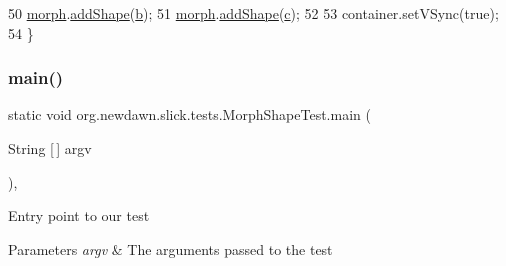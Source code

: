 \begin{DoxyCode}
50         \mbox{\hyperlink{classorg_1_1newdawn_1_1slick_1_1tests_1_1_morph_shape_test_aa71e79154a050babecb8bdd71caeaedd}{morph}}.\mbox{\hyperlink{classorg_1_1newdawn_1_1slick_1_1geom_1_1_morph_shape_a3f052286d029f6277988a385cc633a68}{addShape}}(\mbox{\hyperlink{classorg_1_1newdawn_1_1slick_1_1tests_1_1_morph_shape_test_a8c12651e74bf24e1b5c00aa960c8f655}{b}});
51         \mbox{\hyperlink{classorg_1_1newdawn_1_1slick_1_1tests_1_1_morph_shape_test_aa71e79154a050babecb8bdd71caeaedd}{morph}}.\mbox{\hyperlink{classorg_1_1newdawn_1_1slick_1_1geom_1_1_morph_shape_a3f052286d029f6277988a385cc633a68}{addShape}}(\mbox{\hyperlink{classorg_1_1newdawn_1_1slick_1_1tests_1_1_morph_shape_test_aafd5685d9c5de3a529add5a3f44986d2}{c}});
52         
53         container.setVSync(\textcolor{keyword}{true});
54     \}
\end{DoxyCode}
\mbox{\label{classorg_1_1newdawn_1_1slick_1_1tests_1_1_morph_shape_test_aaf24e70f71dd9d74f3e54ae9c7880338}} 
\subsubsection{\texorpdfstring{main()}{main()}}
{\footnotesize\ttfamily static void org.\+newdawn.\+slick.\+tests.\+Morph\+Shape\+Test.\+main (\begin{DoxyParamCaption}\item[{String \mbox{[}$\,$\mbox{]}}]{argv }\end{DoxyParamCaption})\hspace{0.3cm}{\ttfamily [inline]}, {\ttfamily [static]}}

Entry point to our test


\begin{DoxyParams}{Parameters}
{\em argv} & The arguments passed to the test \\
\hline
\end{DoxyParams}

